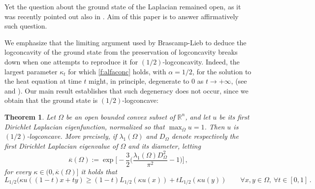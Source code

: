 \documentclass[11pt]{amsart}
\newtheorem{theorem}{Theorem}
\theoremstyle{definition}
\theoremstyle{remark}
\def\R{\mathbb{R}}
\def\Om{\Omega}
\def\k{\kappa}
\begin{document}
Yet the question about the ground state of the Laplacian remained  open, as it was recently pointed  out also  in \cite{HN25}.
Aim of this paper is to answer affirmatively such question.

We emphasize that the limiting argument used by Brascamp-Lieb to deduce the logconcavity of the ground state from the preservation of  logconcavity  breaks down when one attempts to reproduce it for  $(1/2)$-logconcavity.  Indeed,   the largest parameter $\k _t$  for which
\eqref{f:alfaconc}  holds, with $\alpha = 1/2$, for the solution to the heat equation at time $t$ might, in principle, degenerate to $0$ as $t \to + \infty$, 
(see \cite[Remark 4.2]{IST20} and \cite[Section 5]{IST22}). 
Our main result establishes that such degeneracy does not occur, since we obtain that 
the ground state is $(1/2)$-logconcave:
 

\begin{theorem}\label{t:12log}  Let $\Om$ be an open bounded convex subset of $\R ^n$, and let $u$ be its first Dirichlet Laplacian eigenfunction, normalized so that 
$\max _{\overline \Om } u = 1$. 
Then $u$ is $(1/2)$-logconcave. More precisely,  if $\lambda _ 1 (\Om)$ and $D _\Om$ denote respectively the first Dirichlet Laplacian eigenvalue of $\Om$ and its 
diameter, 
letting 
\begin{equation}\label{f:kappa} 
 \overline \k (\Om):= \exp \Big [- \frac 3 2 \Big ( \frac{ \lambda _ 1 (\Om) D _\Om^2  }{\pi ^ 2}  -1 \Big )  \Big ]  \,,
 \end{equation} 
for every $\k \in (0,  \overline \k (\Om)]$ it holds that
$$ L _{1/2}  (\k u ( ( 1- t )  x + t  y) \geq ( 1- t) L _{1/2} (\k u (x)) + t L _{1/2} (\k u  (y)) \qquad \forall x, y \in \Om, \ \forall t  \in [0, 1]\,.$$  

\end{theorem} 
\end{document}
